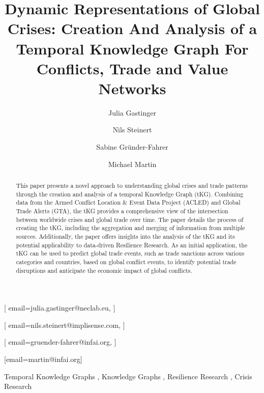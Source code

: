 \documentclass[
]{ceurart}
\begin{document}


\title{Dynamic Representations of Global Crises: Creation And Analysis of a Temporal Knowledge Graph For Conflicts, Trade and Value Networks}

\author[1,2]{Julia Gastinger}[
email=julia.gastinger@neclab.eu,
]
\cormark[1]
\address[1]{NEC Laboratories Europe GmbH, Kurfuersten-Anlage 36, 69115 Heidelberg, Germany}
\address[2]{University of Mannheim, Data and Web Science Group, B 6, 26, 68159 Mannheim, Germany}

\author[3]{Nils Steinert}[
email=nils.steinert@implisense.com,
]
\address[3]{Implisense GmbH, Spiekermannstraße 31a, 13189 Berlin, Germany}

\author[4]{Sabine Gründer-Fahrer}[
email=gruender-fahrer@infai.org,
]
\author[4]{Michael Martin}[email=martin@infai.org]
\address[4]{Institute for Applied Informatics (InfAI), Goerdelerring 9, 04109 Leipzig, Germany}


\begin{abstract}
This paper presents a novel approach to understanding global crises and trade patterns through the creation and analysis of a temporal Knowledge Graph (tKG). Combining data from the Armed Conflict Location \& Event Data Project (ACLED) and Global Trade Alerts (GTA), the tKG provides a comprehensive view of the intersection between worldwide crises and global trade over time. The paper details the process of creating the tKG, including the aggregation and merging of information from multiple sources. 
Additionally, the paper offers insights into the analysis of the tKG and its potential applicability to data-driven Resilience Research. As an initial application, the tKG can be used to predict global trade events, such as trade sanctions across various categories and countries, based on global conflict events, to identify potential trade disruptions and anticipate the economic impact of global conflicts.
\end{abstract}

\begin{keywords}
  Temporal Knowledge Graphs \sep
  Knowledge Graphs \sep
  Resilience Research \sep
  Crisis Research
\end{keywords}
\end{document}
